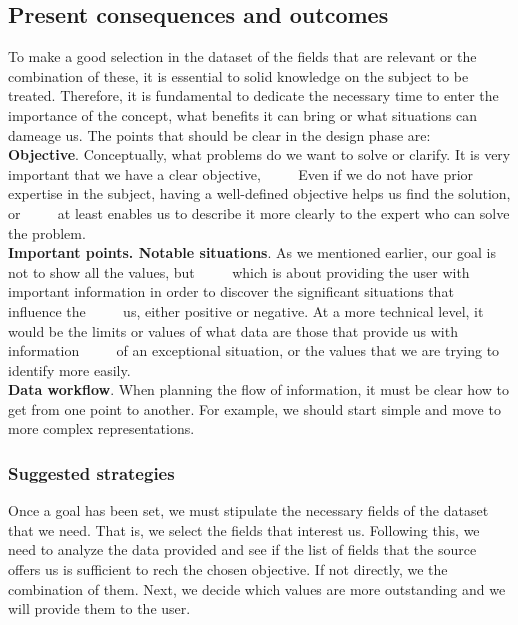 \subsection{Present consequences and outcomes}

To make a good selection in the dataset of the fields that are relevant or the combination of these, it is essential to
solid knowledge on the subject to be treated. Therefore, it is fundamental to dedicate the necessary time to enter the
importance of the concept, what benefits it can bring or what situations can dameage us.
The points that should be clear in the design phase are: \\

\textbf{Objective}. Conceptually, what problems do we want to solve or clarify. It is very important that we have a clear objective,
     Even if we do not have prior expertise in the subject, having a well-defined objective helps us find the solution, or
     at least enables us to describe it more clearly to the expert who can solve the problem. \\

\textbf{Important points. Notable situations}. As we mentioned earlier, our goal is not to show all the values, but
     which is about providing the user with important information in order to discover the significant situations that influence the
     us, either positive or negative. At a more technical level, it would be the limits or values of what data are those that provide us with information
     of an exceptional situation, or the values that we are trying to identify more easily. \\

\textbf{Data workflow}. When planning the flow of information, it must be clear how to get from one point to another. For example, 
we should start simple and move to more complex representations.

\subsubsection*{Suggested strategies} 

Once a goal has been set, we must stipulate the necessary fields of the dataset that we need. That is, we select the fields that interest us. 
Following this, we need to analyze the data provided and see if the list of fields that the source offers us is sufficient to rech the chosen objective.
If not directly, we the combination of them. Next, we decide which values are more outstanding and we will provide them to the user.

